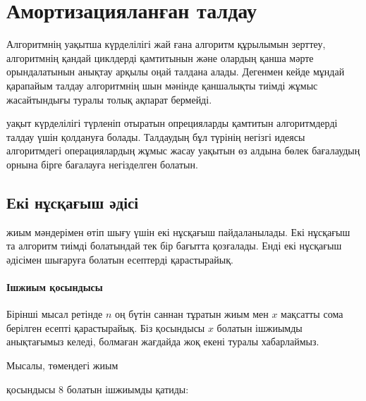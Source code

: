 \chapter{Амортизацияланған талдау}


Алгоритмнің уақытша күрделілігі жай ғана
алгоритм құрылымын зерттеу, алгоритмнің қандай циклдерді
қамтитынын және олардың қанша мәрте орындалатынын анықтау арқылы оңай 
талдана алады.
Дегенмен кейде мұндай қарапайым талдау алгоритмнің
шын мәнінде қаншалықты тиімді жұмыс жасайтындығы
туралы толық ақпарат бермейді.

 уақыт күрделілігі түрленіп отыратын опрецияларды қамтитын алгоритмдерді талдау үшін қолдануға болады. Талдаудың бұл түрінің негізгі идеясы алгоритмдегі операциялардың 
жұмыс жасау уақытын өз алдына бөлек бағалаудың орнына
бірге бағалауға негізделген болатын.

\section{Екі нұсқағыш әдісі}


 жиым мәндерімен өтіп шығу үшін
екі нұсқағыш пайдаланылады. Екі нұсқағыш та алгоритм тиімді болатындай
тек бір бағытта қозғалады. Енді екі нұсқағыш әдісімен шығаруға болатын есептерді қарастырайық.

\subsubsection{Ішжиым қосындысы}

Бірінші мысал ретінде $n$ оң бүтін саннан тұратын
жиым мен $x$ мақсатты сома берілген есепті қарастырайық. %
Біз қосындысы $x$ болатын ішжиымды анықтағымыз келеді, болмаған жағдайда
жоқ екені туралы хабарлаймыз.

Мысалы, төмендегі жиым
\begin{center}
\end{center}
қосындысы 8 болатын ішжиымды қатиды:
\begin{center}
\end{center}


